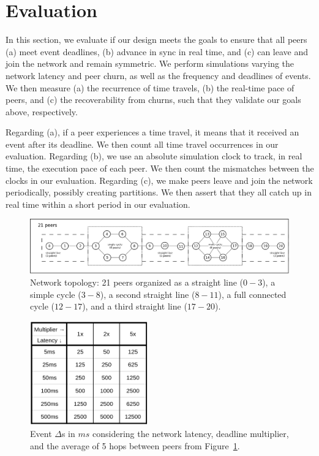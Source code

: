 \documentclass[10pt,journal,compsoc]{IEEEtran}
\begin{document}
\section{Evaluation}
\label{sec.eval}

In this section, we evaluate if our design meets the goals to ensure that all
peers
    (a) meet event deadlines,
    (b) advance in sync in real time, and
    (c) can leave and join the network and remain symmetric.
%
We perform simulations varying the network latency and peer churn, as well as
the frequency and deadlines of events.
%
We then measure
    (a) the recurrence of time travels,
    (b) the real-time pace of peers, and
    (c) the recoverability from churns,
such that they validate our goals above, respectively.

Regarding (a), if a peer experiences a time travel, it means that it received
an event after its deadline.
We then count all time travel occurrences in our evaluation.
%
Regarding (b), we use an absolute simulation clock to track, in real time, the
execution pace of each peer.
We then count the mismatches between the clocks in our evaluation.
%
Regarding (c), we make peers leave and join the network periodically, possibly
creating partitions.
We then assert that they all catch up in real time within a short period in our
evaluation.

\begin{figure}
  \centering
  \includegraphics[width=\linewidth]{topo}
  \caption{
    \label{fig.topo}
    Network topology: 21 peers organized as a straight line ($0-3$), a simple
    cycle ($3-8$), a second straight line ($8-11$), a full connected cycle
    ($12-17$), and a third straight line ($17-20$).
  }
\end{figure}

\begin{figure}
  \centering
  \includegraphics[width=2in]{mult}
  \caption{
    \label{fig.mult}
Event $\Delta$s in $ms$ considering the network latency, deadline multiplier,
and the average of 5 hops between peers from Figure~\ref{fig.topo}.
    }
\end{figure}
\end{document}
